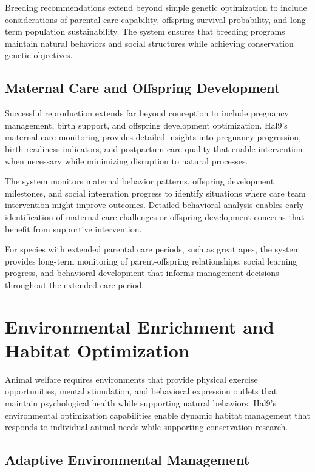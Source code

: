 \documentclass[
  Letterpaper,
]{scrbook}
\begin{document}
Breeding recommendations extend beyond simple genetic optimization to
include considerations of parental care capability, offspring survival
probability, and long-term population sustainability. The system ensures
that breeding programs maintain natural behaviors and social structures
while achieving conservation genetic objectives.

\subsection{Maternal Care and Offspring
Development}\label{maternal-care-and-offspring-development}

Successful reproduction extends far beyond conception to include
pregnancy management, birth support, and offspring development
optimization. Hal9's maternal care monitoring provides detailed insights
into pregnancy progression, birth readiness indicators, and postpartum
care quality that enable intervention when necessary while minimizing
disruption to natural processes.

The system monitors maternal behavior patterns, offspring development
milestones, and social integration progress to identify situations where
care team intervention might improve outcomes. Detailed behavioral
analysis enables early identification of maternal care challenges or
offspring development concerns that benefit from supportive
intervention.

For species with extended parental care periods, such as great apes, the
system provides long-term monitoring of parent-offspring relationships,
social learning progress, and behavioral development that informs
management decisions throughout the extended care period.

\section{Environmental Enrichment and Habitat
Optimization}\label{environmental-enrichment-and-habitat-optimization}

Animal welfare requires environments that provide physical exercise
opportunities, mental stimulation, and behavioral expression outlets
that maintain psychological health while supporting natural behaviors.
Hal9's environmental optimization capabilities enable dynamic habitat
management that responds to individual animal needs while supporting
conservation research.

\subsection{Adaptive Environmental
Management}\label{adaptive-environmental-management}
\end{document}
